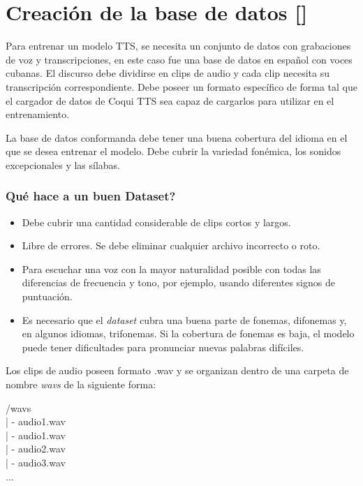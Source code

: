 \section{Creación de la base de datos [\cite{formatting-dataset}]}

Para entrenar un modelo TTS, se necesita un conjunto de datos con grabaciones de voz y transcripciones, en este caso fue una base de datos en español con voces cubanas. El discurso debe dividirse en clips de audio y cada clip necesita su transcripción correspondiente. Debe poseer un formato específico de forma tal que el cargador de datos de Coqui TTS sea capaz de cargarlos para utilizar en el entrenamiento.    

La base de datos conformanda debe tener una buena cobertura del idioma en el que se desea entrenar el modelo. Debe cubrir la variedad fonémica, los sonidos excepcionales y las sílabas. 

\subsubsection{Qué hace a un buen Dataset?}

\begin{itemize}
	\item Debe cubrir una cantidad considerable de clips cortos y largos.
	\item Libre de errores. Se debe eliminar cualquier archivo incorrecto o roto. 
	\item Para escuchar una voz con la mayor naturalidad posible con todas las diferencias de frecuencia y tono, por ejemplo, usando diferentes signos de puntuación.
	\item Es necesario que el \textit{dataset} cubra una buena parte de fonemas, difonemas y, en algunos idiomas, trifonemas. Si la cobertura de fonemas es baja, el modelo puede tener dificultades para pronunciar nuevas palabras difíciles.
	
\end{itemize}

Los clips de audio poseen formato .wav y se organizan dentro de una carpeta de nombre \textit{wavs} de la siguiente forma:

\begin{center}
	/wavs\\
	| - audio1.wav\\
	| - audio1.wav\\
	| - audio2.wav\\
	| - audio3.wav\\
	...
\end{center}

